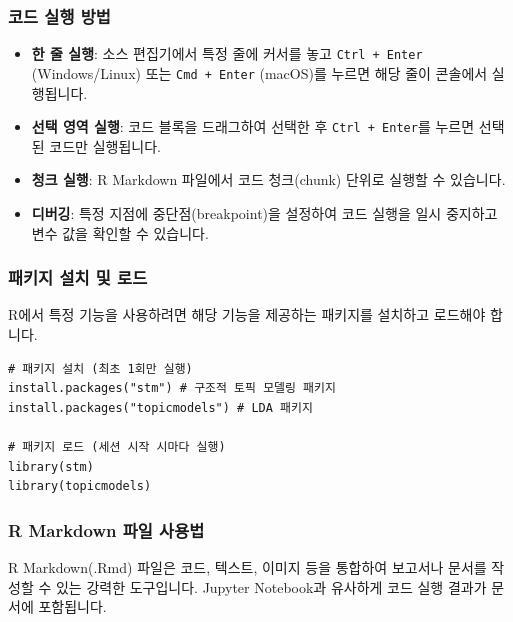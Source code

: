 \documentclass[11pt,a4paper]{article}
\theoremstyle{definition}
\begin{document}
\subsubsection*{코드 실행 방법}
\begin{itemize}
    \item \textbf{한 줄 실행}: 소스 편집기에서 특정 줄에 커서를 놓고 \texttt{Ctrl + Enter} (Windows/Linux) 또는 \texttt{Cmd + Enter} (macOS)를 누르면 해당 줄이 콘솔에서 실행됩니다.
    \item \textbf{선택 영역 실행}: 코드 블록을 드래그하여 선택한 후 \texttt{Ctrl + Enter}를 누르면 선택된 코드만 실행됩니다.
    \item \textbf{청크 실행}: R Markdown 파일에서 코드 청크(chunk) 단위로 실행할 수 있습니다.
    \item \textbf{디버깅}: 특정 지점에 중단점(breakpoint)을 설정하여 코드 실행을 일시 중지하고 변수 값을 확인할 수 있습니다.
\end{itemize}

\subsubsection*{패키지 설치 및 로드}
R에서 특정 기능을 사용하려면 해당 기능을 제공하는 패키지를 설치하고 로드해야 합니다.
\begin{lstlisting}[caption={R 패키지 설치 및 로드 예시}, label={lst:r_package}]
# 패키지 설치 (최초 1회만 실행)
install.packages("stm") # 구조적 토픽 모델링 패키지
install.packages("topicmodels") # LDA 패키지

# 패키지 로드 (세션 시작 시마다 실행)
library(stm)
library(topicmodels)
\end{lstlisting}

\subsubsection*{R Markdown 파일 사용법}
\begin{infobox} %
R Markdown(.Rmd) 파일은 코드, 텍스트, 이미지 등을 통합하여 보고서나 문서를 작성할 수 있는 강력한 도구입니다.
Jupyter Notebook과 유사하게 코드 실행 결과가 문서에 포함됩니다.
\end{infobox}
\end{document}
